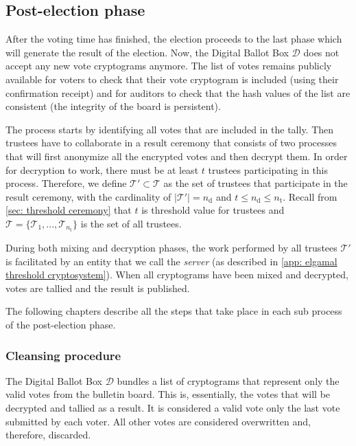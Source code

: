 \clearpage
\subsection{Post-election phase} \label{sec: post-election phase}
After the voting time has finished, the election proceeds to the last phase which will generate the result of the election. Now, the Digital Ballot Box $\mathcal{D}$ does not accept any new vote cryptograms anymore. The list of votes remains publicly available for voters to check that their vote cryptogram is included (using their confirmation receipt) and for auditors to check that the hash values of the list are consistent (the integrity of the board is persistent).

The process starts by identifying all votes that are included in the tally. Then trustees have to collaborate in a result ceremony that consists of two processes that will first anonymize all the encrypted votes and then decrypt them. In order for decryption to work, there must be at least $t$ trustees participating in this process. Therefore, we define $\boldsymbol{\mathcal{T}'} \subset \boldsymbol{\mathcal{T}}$ as the set of trustees that participate in the result ceremony, with the cardinality of $|\boldsymbol{\mathcal{T}'}| = n_\mathrm{d}$ and $t \leq n_\mathrm{d} \leq n_\mathrm{t}$. Recall from \cref{sec: threshold ceremony} that $t$ is threshold value for trustees and $\boldsymbol{\mathcal{T}} = \{ \mathcal{T}_1, ..., \mathcal{T}_{n_\mathrm{t}} \}$ is the set of all trustees. 

During both mixing and decryption phases, the work performed by all trustees $\boldsymbol{\mathcal{T}'}$ is facilitated by an entity that we call the \textit{server} (as described in \cref{app: elgamal threshold cryptosystem}). When all cryptograms have been mixed and decrypted, votes are tallied and the result is published.

The following chapters describe all the steps that take place in each sub process of the post-election phase.


\subsubsection{Cleansing procedure} \label{sec: cleansing procedure}
The Digital Ballot Box $\mathcal{D}$ bundles a list of cryptograms that represent only the valid votes from the bulletin board. This is, essentially, the votes that will be decrypted and tallied as a result. It is considered a valid vote only the last vote submitted by each voter. All other votes are considered overwritten and, therefore, discarded.

